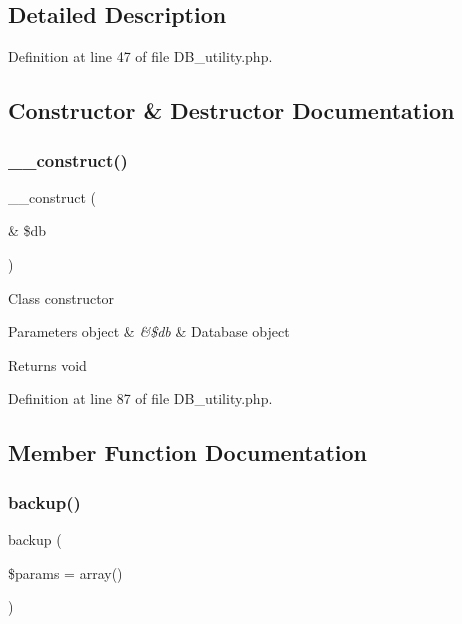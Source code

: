 \subsection{Detailed Description}


Definition at line 47 of file D\+B\+\_\+utility.\+php.



\subsection{Constructor \& Destructor Documentation}
\mbox{\label{class_c_i___d_b__utility_aaf2ef772755ec6f361d44e16cc9ffd69}} 
\subsubsection{\texorpdfstring{\_\_construct()}{\_\_construct()}}
{\footnotesize\ttfamily \+\_\+\+\_\+construct (\begin{DoxyParamCaption}\item[{\&}]{\$db }\end{DoxyParamCaption})}

Class constructor


\begin{DoxyParams}[1]{Parameters}
object & {\em \&\$db} & Database object \\
\hline
\end{DoxyParams}
\begin{DoxyReturn}{Returns}
void 
\end{DoxyReturn}


Definition at line 87 of file D\+B\+\_\+utility.\+php.



\subsection{Member Function Documentation}
\mbox{\label{class_c_i___d_b__utility_abe2b9d47f950dfbaf8c6ec757a9af9a2}} 
\subsubsection{\texorpdfstring{backup()}{backup()}}
{\footnotesize\ttfamily backup (\begin{DoxyParamCaption}\item[{}]{\$params = {\ttfamily array()} }\end{DoxyParamCaption})}

